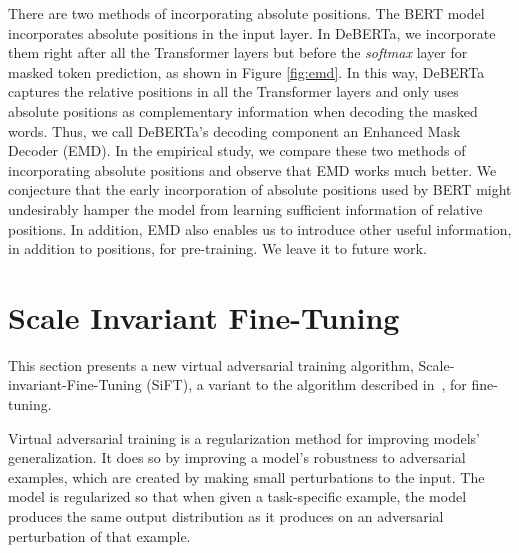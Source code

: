 \documentclass{article}
\begin{document}
There are two methods of incorporating absolute positions. The BERT model incorporates absolute positions in the input layer. 
In DeBERTa, we incorporate them right after all the Transformer layers but before the \emph{softmax} layer for masked token prediction, as shown in Figure \ref{fig:emd}. 
In this way, DeBERTa captures the relative positions in all the Transformer layers and only uses absolute positions as complementary information when decoding the masked words. Thus, we call DeBERTa's decoding component an Enhanced Mask Decoder (EMD). 
In the empirical study, we compare these two methods of incorporating absolute positions and observe that EMD works much better. 
We conjecture that the early incorporation of absolute positions used by BERT might undesirably hamper the model from learning sufficient information of relative positions. In addition, EMD also enables us to introduce other useful information, in addition to positions, for pre-training. We leave it to future work.

















































\section{Scale Invariant Fine-Tuning}

This section presents a new virtual adversarial training algorithm, Scale-invariant-Fine-Tuning (SiFT), a variant to the algorithm described in~\cite{miyato2018vat,jiang2019smart}, for fine-tuning. 

Virtual adversarial training is a regularization method for improving models’ generalization. It does so by improving a model’s robustness to adversarial examples, which are created by making small perturbations to the input. The model is regularized so that when given a task-specific example, the model produces the same output distribution as it produces on an adversarial perturbation of that example. 
\end{document}

